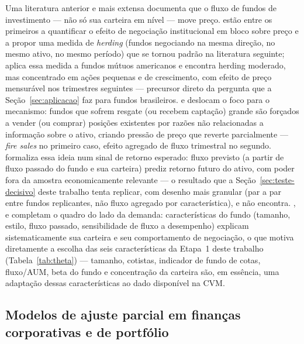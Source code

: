 \documentclass[11pt,a4paper]{article}
\begin{document}
Uma literatura anterior e mais extensa documenta que o fluxo de fundos de investimento --- não
só sua carteira em nível --- move preço.  estão entre os primeiros a
quantificar o efeito de negociação institucional em bloco sobre preço e a propor uma medida de
\emph{herding} (fundos negociando na mesma direção, no mesmo ativo, no mesmo período) que se
tornou padrão na literatura seguinte;  aplica essa medida a fundos
mútuos americanos e encontra herding moderado, mas concentrado em ações pequenas e de
crescimento, com efeito de preço mensurável nos trimestres seguintes --- precursor direto da
pergunta que a Seção~\ref{sec:aplicacao} faz para fundos brasileiros.  e
 deslocam o foco para o mecanismo: fundos que sofrem resgate (ou recebem
captação) grande são forçados a vender (ou comprar) posições existentes por razões não
relacionadas a informação sobre o ativo, criando pressão de preço que reverte parcialmente ---
\emph{fire sales} no primeiro caso, efeito agregado de fluxo trimestral no segundo.
 formaliza essa ideia num sinal de retorno esperado: fluxo previsto (a partir
de fluxo passado do fundo e sua carteira) prediz retorno futuro do ativo, com poder fora da
amostra economicamente relevante --- o resultado que a Seção~\ref{sec:teste-decisivo} deste
trabalho tenta replicar, com desenho mais granular (par a par entre fundos replicantes, não fluxo
agregado por característica), e não encontra. ,
 e  completam o quadro do lado da demanda: características do
fundo (tamanho, estilo, fluxo passado, sensibilidade de fluxo a desempenho) explicam
sistematicamente sua carteira e seu comportamento de negociação, o que motiva diretamente a
escolha das seis características da Etapa~1 deste trabalho (Tabela~\ref{tab:theta}) --- tamanho,
cotistas, indicador de fundo de cotas, fluxo/AUM, beta do fundo e concentração da carteira são,
em essência, uma adaptação dessas características ao dado disponível na CVM.

\subsection{Modelos de ajuste parcial em finanças corporativas e de portfólio}
\end{document}
